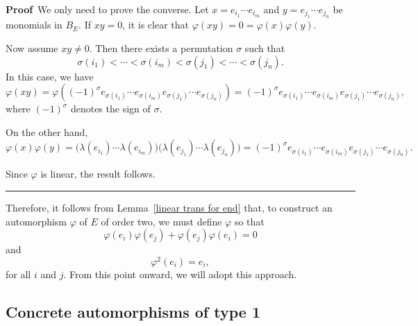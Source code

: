 \documentclass{article}
\newenvironment{proof}[1][Proof]{\noindent\textbf{#1\,} }{\hfill \rule{0.5em}{0.5em}\medskip}
\begin{document}
	\begin{proof}
		We only need to prove the converse.  
		Let $x = e_{i_1}\cdots e_{i_m}$ and $y = e_{j_1}\cdots e_{j_n}$ be monomials in $B_E$. If $xy = 0$, it is clear that $\varphi(xy) = 0 = \varphi(x)\varphi(y)$.  
		
		Now assume $xy \neq 0$. Then there exists a permutation $\sigma$ such that
		\[
		\sigma(i_1) < \cdots < \sigma(i_m) < \sigma(j_1) < \cdots < \sigma(j_n).
		\] 
		In this case, we have
		\[
		\varphi(xy) 
		= \varphi\!\left((-1)^{\sigma} e_{\sigma(i_1)} \cdots e_{\sigma(i_m)} e_{\sigma(j_1)} \cdots e_{\sigma(j_n)}\right) 
		= (-1)^{\sigma} e_{\sigma(i_1)} \cdots e_{\sigma(i_m)} e_{\sigma(j_1)} \cdots e_{\sigma(j_n)},
		\]
		where $(-1)^{\sigma}$ denotes the sign of $\sigma$.  
		
		On the other hand,
		\[
		\varphi(x)\varphi(y) 
		= \big(\lambda(e_{i_1}) \cdots \lambda(e_{i_m})\big)\big(\lambda(e_{j_1}) \cdots \lambda(e_{j_n})\big) 
		= (-1)^{\sigma} e_{\sigma(i_1)} \cdots e_{\sigma(i_m)} e_{\sigma(j_1)} \cdots e_{\sigma(j_n)}.
		\]
		
		Since $\varphi$ is linear, the result follows.
	\end{proof}
	
	
	
	
	
	
	
	
	
	
	
	
	
	
	
	Therefore, it follows from Lemma~\ref{linear trans for end} that, to construct an automorphism 
	$\varphi$ of $E$ of order two, we must define $\varphi$ so that
	\[
	\varphi(e_{i})\varphi(e_{j}) + \varphi(e_{j})\varphi(e_{i}) = 0\]
	and 
	\[\varphi^{2}(e_{i}) = e_{i},
	\]
	for all $i$ and $j$. From this point onward, we will adopt this approach.
	
	
	
	
	
	
	
	\subsection{Concrete automorphisms of type 1}
	
\end{document}
